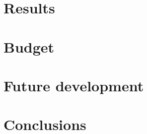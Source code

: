 \documentclass{etsist_pfg}
\begin{document}
\chapter{Results}


\chapter{Budget}


\chapter{Future development}


\chapter{Conclusions}


\printbibliography
\end{document}
